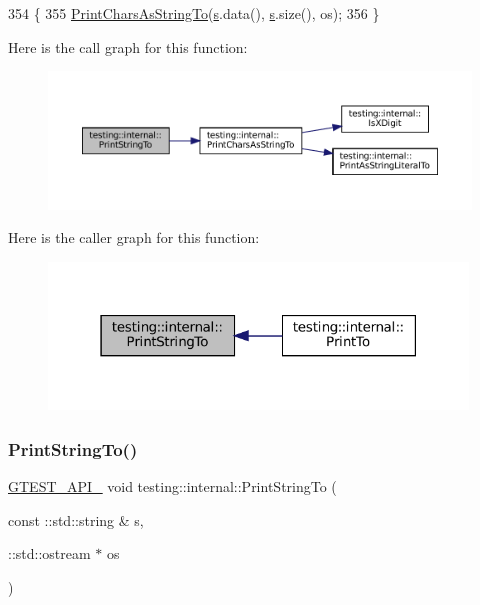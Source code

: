 \begin{DoxyCode}
354                                                     \{
355   \hyperlink{namespacetesting_1_1internal_a0be71e6d7cb274131c559193f81c83e2}{PrintCharsAsStringTo}(\hyperlink{namespaceservice__node__3_aa976421a49e0b54f23833423400849ae}{s}.data(), \hyperlink{namespaceservice__node__3_aa976421a49e0b54f23833423400849ae}{s}.size(), os);
356 \}
\end{DoxyCode}
Here is the call graph for this function\+:
\nopagebreak
\begin{figure}[H]
\begin{center}
\leavevmode
\includegraphics[width=350pt]{namespacetesting_1_1internal_ad609167d8d6792b0fb186539e0e159bd_cgraph}
\end{center}
\end{figure}
Here is the caller graph for this function\+:
\nopagebreak
\begin{figure}[H]
\begin{center}
\leavevmode
\includegraphics[width=316pt]{namespacetesting_1_1internal_ad609167d8d6792b0fb186539e0e159bd_icgraph}
\end{center}
\end{figure}
\mbox{\label{namespacetesting_1_1internal_a8b53e46cea3f8bdfc9342057c4f6ba62}} 
\subsubsection{\texorpdfstring{Print\+String\+To()}{PrintStringTo()}\hspace{0.1cm}{\footnotesize\ttfamily [2/2]}}
{\footnotesize\ttfamily \hyperlink{gtest-port_8h_aa73be6f0ba4a7456180a94904ce17790}{G\+T\+E\+S\+T\+\_\+\+A\+P\+I\+\_\+} void testing\+::internal\+::\+Print\+String\+To (\begin{DoxyParamCaption}\item[{const \+::std\+::string \&}]{s,  }\item[{\+::std\+::ostream $\ast$}]{os }\end{DoxyParamCaption})}



